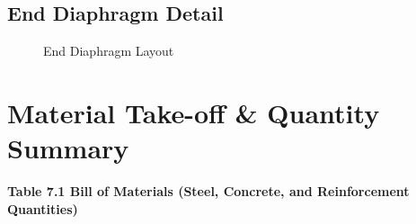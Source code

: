 \documentclass[12pt,a4paper]{report}
\numberwithin{table}{chapter}
\numberwithin{figure}{chapter}
\begin{document}
\section{End Diaphragm Detail}
\label{sec:diaphragm-detail}

\begin{figure}[H]
\centering
{}
\caption{End Diaphragm Layout}
\label{fig:ed-layout}
\end{figure}


\noindent
\begin{minipage}[t]{0.31\textwidth}
\centering
{}
\label{fig:ed-bracing-sec}
\end{minipage}
\hfill
\begin{minipage}[t]{0.31\textwidth}
\centering
{}
\label{fig:ed-top-chord}
\end{minipage}
\hfill
\begin{minipage}[t]{0.31\textwidth}
\centering
{}
\label{fig:ed-bottom-chord}
\end{minipage}



\chapter{Material Take-off \& Quantity Summary}
\label{ch:material-takeoff}

\noindent\textbf{Table 7.1  Bill of Materials (Steel, Concrete, and Reinforcement Quantities)}
\end{document}
